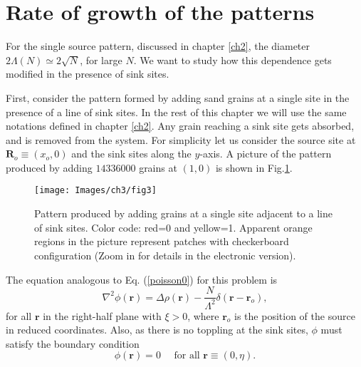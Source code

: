 \documentclass[11pt,a4paper]{book}
\begin{document}
\section{Rate of growth of the patterns}\label{ch3.2}
For the single source pattern, discussed in chapter \ref{ch2}, the diameter $2\Lambda\left( N \right)\simeq2\sqrt{N}$,
for large $N$. We want to study how this dependence gets modified in the presence
of sink sites.

First, consider the pattern formed by adding sand grains at a single site in
the presence of a line of sink sites. In the rest of this chapter we
will use the same notations defined in chapter \ref{ch2}. Any grain reaching
a sink site gets absorbed, and is removed from the system. For simplicity let us consider the
source site at $\mathbf{R}_{o}\equiv\left(x_{o}, 0  \right)$ and the sink sites along
the $y$-axis. A picture of the  pattern produced by adding $14336000$ grains at
$\left( 1, 0 \right)$ is shown in Fig.\ref{fig:lsone}.
\begin{figure}
\begin{center}
\texttt{[image: Images/ch3/fig3]}
\caption{ Pattern produced by adding grains at a single site adjacent to a line
of sink sites. Color code: red=0 and yellow=1. Apparent orange regions in the picture represent
patches with checkerboard configuration (Zoom in for details in the
electronic version).}
\label{fig:lsone}
\end{center}
\end{figure}

The equation analogous to Eq. (\ref{poisson0}) for this problem is
\begin{equation}
\nabla^{2}\phi\left( \mathbf{r} \right)=\Delta\rho\left( \mathbf{r} \right)-\frac{N}{\Lambda^{2}}\delta\left( \mathbf{r} - \mathbf{r}_{o} \right),
\label{poisson}
\end{equation}
for all $\mathbf{r}$ in the right-half plane with $\xi > 0$,
where $\mathbf{r}_{o}$ is the position of the source in reduced
coordinates. Also, as there is no toppling at the sink sites, $\phi$
must satisfy the boundary condition
\begin{equation}
\phi\left( \mathbf{r} \right)=0 \textrm{~ ~ for~all~}\mathbf{r}\equiv
\left(0, \eta \right).
\label{bc}
\end{equation}
\end{document}

